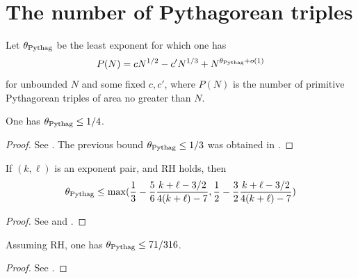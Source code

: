 \chapter{The number of Pythagorean triples}\label{pythagorean-chapter}

\begin{definition}\label{pythag-def}  Let $\theta_{\mathrm{Pythag}}$ be the least exponent for which one has
$$ P(N) = c N^{1/2} - c' N^{1/3} + N^{\theta_{\mathrm{Pythag}}+o(1)}$$
for unbounded $N$ and some fixed $c,c'$, where $P(N)$ is the number of primitive Pythagorean triples of area no greater than $N$.
\end{definition}

\begin{lemma}\label{pythag-14} One has $\theta_{\mathrm{Pythag}} \leq 1/4$.
\end{lemma}

\begin{proof} See \cite{wild_1955, duttlinger_schwarz}.  The previous bound $\theta_{\mathrm{Pythag}} \leq 1/3$ was obtained in \cite{lambek_moser}.
\end{proof}

\begin{lemma}\label{exp_pair_to_pythag} If $(k,\ell)$ is an exponent pair, and RH holds, then
$$ \theta_{\mathrm{Pythag}} \leq \max( \frac{1}{3} - \frac{5}{6} \frac{k+\ell-3/2}{4(k+\ell)-7}, \frac{1}{2} - \frac{3}{2}\frac{k+\ell-3/2}{4(k+\ell)-7} )$$
\end{lemma}

\begin{proof} See \cite{menzer} and \cite[Section 5.10]{trudgian-yang}.
\end{proof}

\begin{lemma}\label{pythag-71-316} Assuming RH, one has $\theta_{\mathrm{Pythag}} \leq 71/316$.
\end{lemma}

\begin{proof} See \cite[Section 5.10]{trudgian-yang}.
\end{proof}
